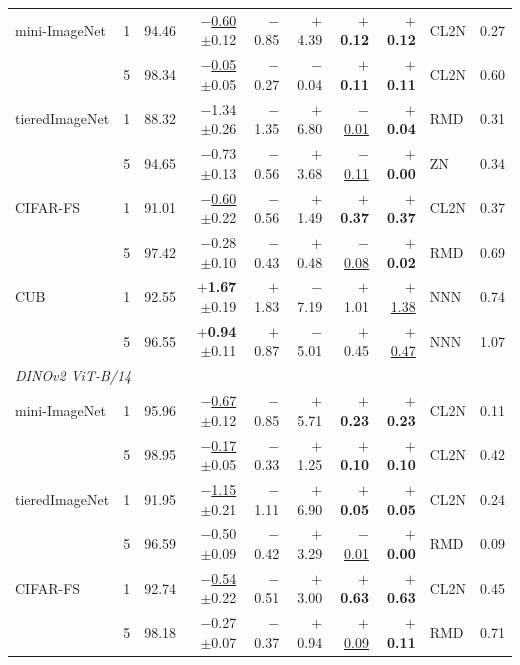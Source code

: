 \begin{table}[tbp]
\begin{tabular}{lcrrrrrrlr}
mini-ImageNet & 1 & 94.46 & \underline{$-$0.60}{\tiny$\pm$0.12} & $-$0.85 & $+$4.39 & \textbf{\boldmath $+$0.12} & \textbf{\boldmath $+$0.12} & CL2N & 0.27 \\
 & 5 & 98.34 & \underline{$-$0.05}{\tiny$\pm$0.05} & $-$0.27 & $-$0.04 & \textbf{\boldmath $+$0.11} & \textbf{\boldmath $+$0.11} & CL2N & 0.60 \\
tieredImageNet & 1 & 88.32 & $-$1.34{\tiny$\pm$0.26} & $-$1.35 & $+$6.80 & \underline{$-$0.01} & \textbf{\boldmath $+$0.04} & RMD & 0.31 \\
 & 5 & 94.65 & $-$0.73{\tiny$\pm$0.13} & $-$0.56 & $+$3.68 & \underline{$-$0.11} & \textbf{\boldmath $+$0.00} & ZN & 0.34 \\
CIFAR-FS & 1 & 91.01 & \underline{$-$0.60}{\tiny$\pm$0.22} & $-$0.56 & $+$1.49 & \textbf{\boldmath $+$0.37} & \textbf{\boldmath $+$0.37} & CL2N & 0.37 \\
 & 5 & 97.42 & $-$0.28{\tiny$\pm$0.10} & $-$0.43 & $+$0.48 & \underline{$-$0.08} & \textbf{\boldmath $+$0.02} & RMD & 0.69 \\
CUB & 1 & 92.55 & \textbf{\boldmath $+$1.67}{\tiny$\pm$0.19} & $+$1.83 & $-$7.19 & $+$1.01 & \underline{$+$1.38} & NNN & 0.74 \\
 & 5 & 96.55 & \textbf{\boldmath $+$0.94}{\tiny$\pm$0.11} & $+$0.87 & $-$5.01 & $+$0.45 & \underline{$+$0.47} & NNN & 1.07 \\
\midrule
\multicolumn{10}{l}{\textit{DINOv2 ViT-B/14}} \\
mini-ImageNet & 1 & 95.96 & \underline{$-$0.67}{\tiny$\pm$0.12} & $-$0.85 & $+$5.71 & \textbf{\boldmath $+$0.23} & \textbf{\boldmath $+$0.23} & CL2N & 0.11 \\
 & 5 & 98.95 & \underline{$-$0.17}{\tiny$\pm$0.05} & $-$0.33 & $+$1.25 & \textbf{\boldmath $+$0.10} & \textbf{\boldmath $+$0.10} & CL2N & 0.42 \\
tieredImageNet & 1 & 91.95 & \underline{$-$1.15}{\tiny$\pm$0.21} & $-$1.11 & $+$6.90 & \textbf{\boldmath $+$0.05} & \textbf{\boldmath $+$0.05} & CL2N & 0.24 \\
 & 5 & 96.59 & $-$0.50{\tiny$\pm$0.09} & $-$0.42 & $+$3.29 & \underline{$-$0.01} & \textbf{\boldmath $+$0.00} & RMD & 0.09 \\
CIFAR-FS & 1 & 92.74 & \underline{$-$0.54}{\tiny$\pm$0.22} & $-$0.51 & $+$3.00 & \textbf{\boldmath $+$0.63} & \textbf{\boldmath $+$0.63} & CL2N & 0.45 \\
 & 5 & 98.18 & $-$0.27{\tiny$\pm$0.07} & $-$0.37 & $+$0.94 & \underline{$+$0.09} & \textbf{\boldmath $+$0.11} & RMD & 0.71 \\

\end{tabular}
\end{table}
